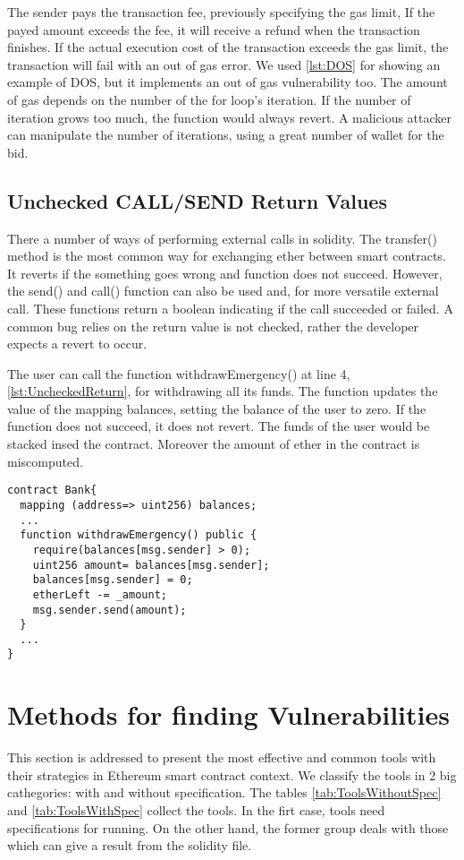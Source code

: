 \documentclass[a4paper,sigconf, language=french,
language=german, language=spanish, language=english]{acmart}
\begin{document}
The sender pays the transaction fee, previously specifying the gas limit, If the payed amount exceeds the fee, it will receive a refund when the transaction finishes. 
If the actual execution cost of the transaction exceeds the gas limit, the transaction will fail with an out of gas error. 
We used \autoref{lst:DOS} for showing an example of DOS, but it implements an out of gas vulnerability too. 
The amount of gas depends on the number of the for loop's iteration. If the number of iteration grows too much, the function would always revert. A malicious attacker can 
manipulate the number of iterations, using a great number of wallet for the bid.

\subsection{Unchecked CALL/SEND Return Values} There a number of ways of performing external calls in solidity. The transfer() method is the most common way for exchanging ether between smart contracts. 
It reverts if the something goes wrong and function does not succeed. However, the send() and call() function can also be used and, for more versatile external call. 
These functions return a boolean indicating if the call succeeded or failed.  A common bug relies on the return value is not checked, rather the developer expects a revert to occur. 

The user can call the function withdrawEmergency()  at line 4, \autoref{lst:UncheckedReturn}, for withdrawing all its funds. The function updates the value of the mapping balances, setting 
the balance of the user to zero. If the function does not succeed, it does not revert. 
The funds of the user would be stacked insed the contract. Moreover the amount of ether in the contract is miscomputed.


\begin{lstlisting}[language=Solidity,caption={Unchecked CALL/SEND Return Values},label={lst:UncheckedReturn}]
contract Bank{
  mapping (address=> uint256) balances;
  ... 
  function withdrawEmergency() public {
    require(balances[msg.sender] > 0);
    uint256 amount= balances[msg.sender];
    balances[msg.sender] = 0;
    etherLeft -= _amount;
    msg.sender.send(amount);
  }
  ...
}

\end{lstlisting}

\section{Methods for finding Vulnerabilities}
\label{MethodologiesForTools}
This section is addressed to present the most effective and common tools with their strategies in Ethereum smart contract context. 
We classify the tools in 2 big cathegories: with and without specification. The tables \ref{tab:ToolsWithoutSpec} and \ref{tab:ToolsWithSpec} collect the tools. 
In the firt case, tools need specifications for running. On the other hand,  the former group 
deals with those which can give a result from the solidity file.
\end{document}
